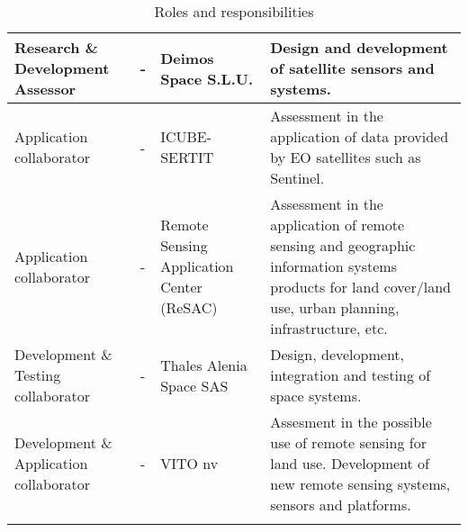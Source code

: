 \begin{center}
\begin{longtable}{>{\raggedright\arraybackslash}p{3cm}>{\raggedright\arraybackslash}p{3cm}>{\raggedright\arraybackslash}p{3cm}>{\raggedright\arraybackslash}p{5cm}}
		Research \& Development Assessor & - & Deimos Space S.L.U. & Design and development of satellite sensors and systems. \\ \hline
		Application collaborator & - & ICUBE-SERTIT & Assessment in the application of data provided by EO satellites such as Sentinel. \\ \hline
		Application collaborator & - & Remote Sensing Application Center (ReSAC) & Assessment in the application of remote sensing and geographic information systems products for land cover/land use, urban planning, infrastructure, etc. \\ \hline
		Development \& Testing collaborator & - & Thales Alenia Space SAS & Design, development, integration and testing of space systems. \\ \hline
		Development \& Application collaborator & - & VITO nv & Assesment in the possible use of remote sensing for land use. Development of new remote sensing systems, sensors and platforms. \\ \bottomrule[2pt]
		\caption{Roles and responsibilities}
		\label{table_roles}	
	\end{longtable}
\end{center}